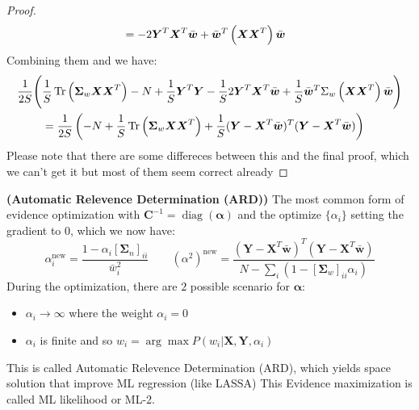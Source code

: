 \begin{proof}
\begin{equation*}
\begin{aligned}
        &= -2\boldsymbol Y^T\boldsymbol X^T\bar{\boldsymbol w} + \bar{\boldsymbol w}^T \left( \boldsymbol X\boldsymbol X^T \right)\bar{\boldsymbol w}
    \end{aligned}
    \end{equation*}
    Combining them and we have:
    \begin{equation*}
    \begin{aligned}
        \frac{1}{2S}\Bigg( &\frac{1}{S}\operatorname{Tr}\left( \boldsymbol \Sigma_w\boldsymbol X\boldsymbol X^T \right) - N + \frac{1}{S}\boldsymbol Y^T\boldsymbol Y - \frac{1}{S}2\boldsymbol Y^T\boldsymbol X^T\bar{\boldsymbol w} + \frac{1}{S}\bar{\boldsymbol w}^T \Sigma_w\left( \boldsymbol X\boldsymbol X^T \right)\bar{\boldsymbol w} \Bigg) \\
        &= \frac{1}{2S}\left( -N + \frac{1}{S}\operatorname{Tr}\left(  \boldsymbol \Sigma_w\boldsymbol X\boldsymbol X^T \right) + \frac{1}{S} (\boldsymbol Y - \boldsymbol X^T\bar{\boldsymbol w})^T(\boldsymbol Y - \boldsymbol X^T\bar{\boldsymbol w})  \right)
    \end{aligned}
    \end{equation*}
    Please note that there are some differeces between this and the final proof, which we can't get it but most of them seem correct already
\end{proof}

\begin{definition}{\textbf{(Automatic Relevence Determination (ARD))}}
    The most common form of evidence optimization with $\boldsymbol C^{-1} = \operatorname{diag}(\boldsymbol \alpha)$ and the optimize $\{\alpha_i\}$ setting the gradient to $0$, which we now have:
    \begin{equation*}
        \alpha^\text{new}_i = \frac{1-\alpha_i[\boldsymbol \Sigma_n]_{ii}}{\bar{w}_i^2} \qquad (\alpha^2)^\text{new} = \frac{(\boldsymbol Y - \boldsymbol X^T\bar{\boldsymbol w})^T(\boldsymbol Y - \boldsymbol X^T\bar{\boldsymbol w})}{N - \sum_i (1 - [\boldsymbol \Sigma_w]_{ii}\alpha_i)}
    \end{equation*}
    During the optimization, there are $2$ possible scenario for $\boldsymbol \alpha$:
    \begin{itemize}
        \item $\alpha_i\rightarrow\infty$ where the weight $\alpha_i = 0$
        \item $\alpha_i$ is finite and so $w_i = \arg\max P(w_i | \boldsymbol X, \boldsymbol Y, \alpha_i)$
    \end{itemize}
    This is called Automatic Relevence Determination (ARD), which yields space solution that improve ML regression (like LASSA) This Evidence maximization is called ML likelihood or ML-2. 
\end{definition}


